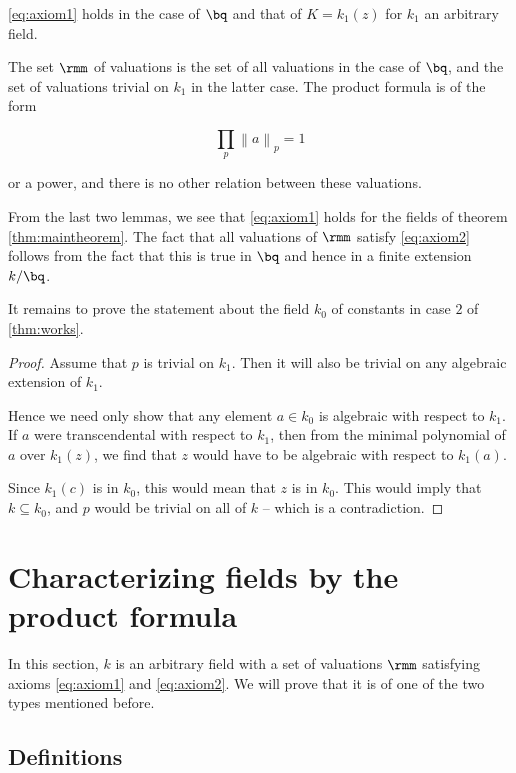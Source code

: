 \begin{thm}
  \ref{eq:axiom1} holds in the case of $\bq$ and that of $K=k_1(z)$ for $k_1$ an
  arbitrary field.
\end{thm}

The set $\rmm$ of valuations is the set of all valuations in the case of
$\bq$, and the set of valuations trivial on $k_1$ in the latter case. The
product formula is of the form

\[ \prod_p {\left\lVert a \right\rVert}_p = 1 \]

or a power, and there is no other relation between these valuations.

From the last two lemmas, we see that \ref{eq:axiom1} holds for the fields of
theorem \ref{thm:maintheorem}. The fact that all valuations of $\rmm$ satisfy
\ref{eq:axiom2} follows from the fact that this is true in $\bq$ and hence in a
finite extension $k/\bq$.

It remains to prove the statement about the field $k_0$ of constants in case $2$
of \ref{thm:works}.

\begin{proof}
  Assume that $p$ is trivial on $k_1$. Then it will also be trivial on any
  algebraic extension of $k_1$.

  Hence we need only show that any element $a \in k_0$ is algebraic with respect
  to $k_1$. If $a$ were transcendental with respect to $k_1$, then from the
  minimal polynomial of $a$ over $k_1(z)$, we find that $z$ would have to be
  algebraic with respect to $k_1(a)$.

  Since $k_1(c)$ is in $k_0$, this would mean that $z$ is in $k_0$. This would
  imply that $k\subseteq k_0$, and $p$ would be trivial on all of $k$ -- which
  is a contradiction.
\end{proof}



\section{Characterizing fields by the product formula}

In this section, $k$ is an arbitrary field with a set of valuations $\rmm$
satisfying axioms \ref{eq:axiom1} and \ref{eq:axiom2}. We will prove that it is
of one of the two types mentioned before.

\subsection{Definitions}


